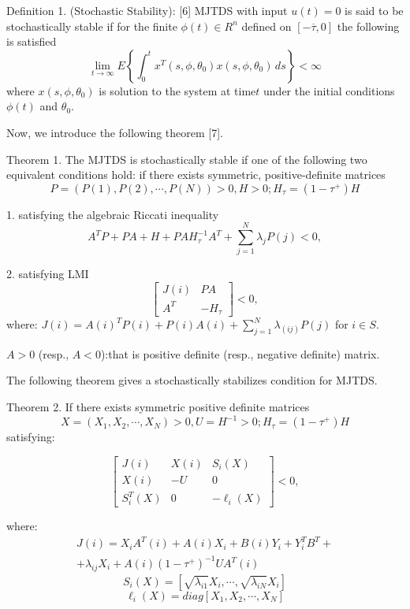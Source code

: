Definition 1. (Stochastic Stability): [6] MJTDS with input $u(t)=0$ is said to be stochastically stable if for the finite $\phi(t)\in R^n$ defined on $[-\overline \tau,0]$ the following is satisfied
\begin{equation}
\lim_{t\to\infty} E\left\{\int_{0}^{t} x^T(s,\phi,\theta_0)x(s,\phi,\theta_0) \,ds\right\}<\infty
\end{equation}
where $x(s,\phi,\theta_0)$ is solution to the system at time$t$ under the initial conditions $\phi(t)$  and $\theta_0 $.

Now, we introduce the following theorem [7].

Theorem 1. The MJTDS is stochastically stable if one of the following two equivalent conditions hold:
if there exists symmetric, positive-definite matrices
\begin{equation}
P=(P(1),P(2),\cdots,P(N))>0 ,H>0; H_\tau =(1-\tau^+)H
\end{equation}

1. satisfying the algebraic Riccati inequality
\begin{equation}
A^TP+PA+H+PAH_\tau^{-1} A^T +\sum_{j=1}^{N}\lambda_jP(j)<0,
\end{equation}

2. satisfying LMI
\begin{equation}
\begin{bmatrix}
J(i) & PA\\
A^T & -H_\tau
\end{bmatrix} <0,
\end{equation}
where:
 $J(i)=A(i)^TP(i)+P(i)A(i)+\sum_{j=1}^{N}\lambda_(ij)P(j)$ for $i \in S$.

$A>0$ (resp., $A<0$):that is positive definite (resp., negative definite) matrix.

The following theorem gives a stochastically stabilizes condition for MJTDS.

Theorem 2. If there exists symmetric positive definite matrices
$$X=(X_1,X_2,\cdots,X_N)>0 ,U=H^{-1}>0; H_\tau =(1-\tau^+)H$$ satisfying:

\begin{equation}
\begin{bmatrix}
J(i) & X(i) & S_i(X)\\
X(i) & -U & 0 \\
S_i^T(X) & 0 & -\ell_i(X)
\end{bmatrix} <0,
\end{equation}

where:
\begin{multline*}
	J(i)=X_iA^T(i)+A(i)X_i+B(i)Y_i+Y_i^TB^T+
	\\+
	\lambda_{ij}X_i+A(i)(1-\tau^+)^{-1}UA^T(i)
\end{multline*}
$$S_i(X)=[\sqrt{\lambda_{i1}}X_i,\cdots,\sqrt{\lambda_{iN}}X_i]$$
$$\ell_i(X)=diag[X_1,X_2,\cdots,X_N]$$

